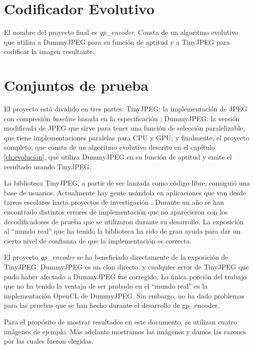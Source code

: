 \section{Codificador Evolutivo}

El nombre del proyecto final es \emph{gp\_encoder}. Consta de un algoritmo
evolutivo que utiliza a DummyJPEG para su función de aptitud y a TinyJPEG
para codificar la imagen resultante.

\section{Conjuntos de prueba} \label{sec:testset}

El proyecto está dividido en tres partes: TinyJPEG: la implementación de JPEG
con compresión \emph{baseline} basada en la especificación \cite{jpeg-spec};
DummyJPEG: la versión modificada de JPEG que sirve para tener una función de
selección paralelizable, que tiene implementaciones paralelas para CPU y GPU; y
finalmente, el proyecto completo, que consta de un algoritmo evolutivo descrito
en el capítulo \ref{ch:evolucion}, que utiliza DummyJPEG en su función de
aptitud y emite el resultado usando TinyJPEG.

La biblioteca TinyJPEG, a partir de ser lanzada como código libre, consiguió
una base de usuarios. Actualmente hay gente usándola en aplicaciones que van
desde tareas escolares hasta proyectos de investigación \cite{humblebrag}.
Durante un año se han encontrado distintos errores de implementación que no
aparecieron con los decodificadores de prueba que se utilizaron durante su
desarrollo. La exposición al ``mundo real'' que ha tenido la biblioteca ha sido
de gran ayuda para dar un cierto nivel de confianza de que la implementación es
correcta.

El proyecto \emph{gp\_encoder} se ha beneficiado directamente de la exposición
de TinyJPEG. DummyJPEG es un clon directo, y cualquier error de TinyJPEG que
pudo haber afectado a DummyJPEG fue corregido. La única porción del trabajo que
no ha tenido la ventaja de ser probado en el ``mundo real'' es la implementación
OpenCL de DummyJPEG. Sin embargo, no ha dado problemas para las pruebas que se
han hecho durante el desarrollo de gp\_encoder.

Para el propósito de mostrar resultados en este documento, se utilizan cuatro
imágenes de ejemplo. Más adelante mostramos las imágenes y damos las razones
por las cuales fueron elegidas.

